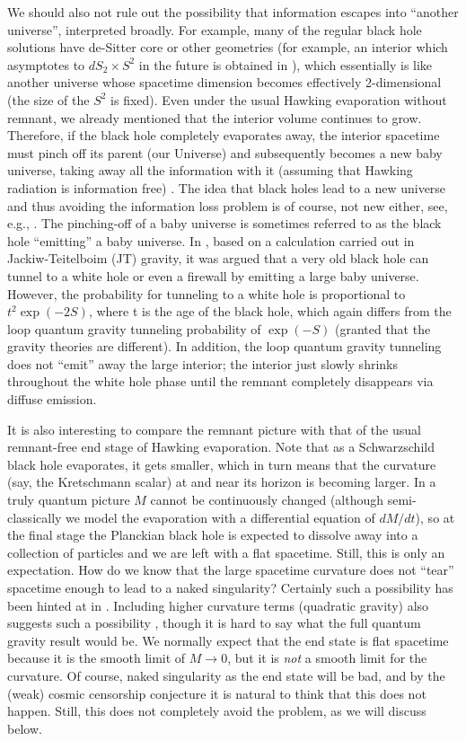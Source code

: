 \documentclass[preprintnumbers, floatfix, preprintnumbers, letterpaper, twocolumn, superscriptaddress,nofootinbib]{revtex4-2}
\begin{document}
We should also not rule out the possibility that information escapes into ``another universe'', interpreted broadly. For example, many of the regular black hole solutions have de-Sitter core or other geometries (for example, an interior which asymptotes to $dS_2 \times S^2$ in the future is obtained in \cite{2005.13260}), which essentially is like another universe whose spacetime dimension becomes effectively 2-dimensional (the size of the $S^2$ is fixed). Even under the usual Hawking evaporation without remnant, we already mentioned that the interior volume continues to grow. Therefore, if the black hole completely evaporates away, the interior spacetime must pinch off its parent (our Universe) and subsequently becomes a new baby universe, taking away all the information with it (assuming that Hawking radiation is information free) \cite{9405007v2}. The idea that black holes lead to a new universe and thus avoiding the information loss problem is of course, not new either, see, e.g., \cite{0103019}. The pinching-off of a baby universe is sometimes referred to as the black hole ``emitting'' a baby universe. In \cite{2208.01625}, based on a calculation carried out in Jackiw-Teitelboim (JT) gravity, it was argued that a very old black hole can tunnel to a white hole or even a firewall by emitting a large baby universe. However, the probability for tunneling to a white hole is proportional to $t^2\exp{(-2S)}$, where t is the age of the black hole, which again differs from the loop quantum gravity tunneling probability of $\exp{(-S)}$ \cite{2407.09584} (granted that the gravity theories are different). In addition, the loop quantum gravity tunneling does not ``emit'' away the large interior; the interior just slowly shrinks throughout the white hole phase until the remnant completely disappears via diffuse emission.

It is also interesting to compare the remnant picture with that of the usual remnant-free end stage of Hawking evaporation. Note that as a Schwarzschild black hole evaporates, it gets smaller, which in turn means that the curvature (say, the Kretschmann scalar) at and near its horizon is becoming larger. In a truly quantum picture $M$ cannot be continuously changed (although semi-classically we model the evaporation with a differential equation of $dM/dt$), so at the final stage the Planckian black hole is expected to dissolve away into a collection of particles and we are left with a flat spacetime. Still, this is only an expectation. How do we know that the large spacetime curvature does not ``tear'' spacetime enough to lead to a naked singularity? Certainly such a possibility has been hinted at in \cite{russo, hiscock}.
Including higher curvature terms (quadratic gravity) also suggests such a possibility \cite{2409.16690}, though it is hard to say what the full quantum gravity result would be. 
We normally expect that the end state is flat spacetime because it is the smooth limit of $M \to 0$, but it is \emph{not} a smooth limit for the curvature. Of course, naked singularity as the end state will be bad, and by the (weak) cosmic censorship conjecture it is natural to think that this does not happen. Still, this does not completely avoid the problem, as we will discuss below.
\end{document}
